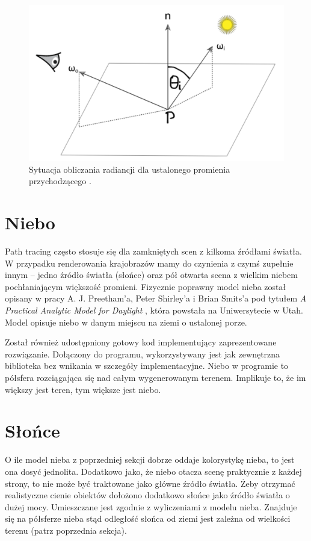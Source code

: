 \documentclass[inz,shortabstract]{iithesis}
\begin{document}
        \begin{figure}[H]
            \includegraphics[width=\linewidth]{renderingEquation.png}
            \caption{Sytuacja obliczania radiancji dla ustalonego promienia przychodzącego \cite{pbrt}.} 
            \label{fig:renderingEquation}
        \end{figure}
        
    \section{Niebo}
        Path tracing często stosuje się dla zamkniętych scen z kilkoma źródłami światła. W przypadku renderowania krajobrazów mamy do czynienia z czymś zupełnie innym -- jedno źródło światła (słońce) oraz pół otwarta scena z wielkim niebem pochłaniającym większość promieni. Fizycznie poprawny model nieba został opisany w pracy  A. J. Preetham'a, 
        Peter Shirley'a i Brian Smits'a pod tytułem \textit{A Practical Analytic Model for Daylight} \cite{sky}, która powstała na Uniwersytecie w Utah. Model opisuje niebo w danym miejscu na ziemi o ustalonej porze. 
        
        Został również udostępniony gotowy kod implementujący zaprezentowane rozwiązanie. Dołączony do programu, wykorzystywany jest jak zewnętrzna biblioteka bez wnikania w szczegóły implementacyjne. Niebo w programie to półsfera rozciągająca się nad całym wygenerowanym terenem. Implikuje to, że im większy jest teren, tym większe jest niebo.
    
    \section{Słońce}
        O ile model nieba z poprzedniej sekcji dobrze oddaje kolorystykę nieba, to jest ona dosyć jednolita. Dodatkowo jako, że niebo otacza scenę praktycznie z każdej strony, to nie może być traktowane jako główne źródło światła. Żeby otrzymać realistyczne cienie obiektów dołożono dodatkowo słońce jako źródło światła o dużej mocy. Umieszczane jest zgodnie z wyliczeniami z modelu nieba. Znajduje się na półsferze nieba stąd odległość słońca od ziemi jest zależna od wielkości terenu (patrz poprzednia sekcja).
        
\end{document}

